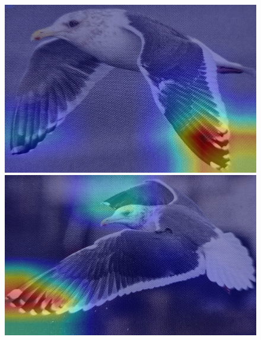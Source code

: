 \documentclass[a4paper,12pt]{report}
\begin{document}
\begin{figure}[htbp]
\begin{multicols}{6}
        \includegraphics[width=\linewidth]{images/interpretability/vgg/bird3.jpg}
        
        \includegraphics[width=\linewidth]{images/interpretability/vgg/bird4.jpg}
        

\end{multicols}
\end{figure}
\end{document}
